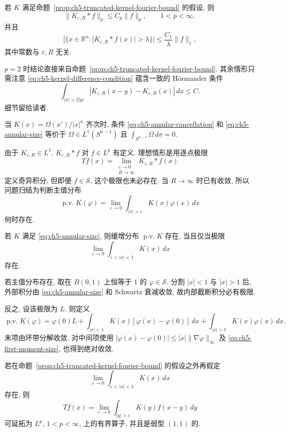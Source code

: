 \hypertarget{chapter-05-page-107}{}
\begin{Corollary}
\label{cor:ch5-uniform-truncation-bounds}
若 $K$ 满足命题~\ref{prop:ch5-truncated-kernel-fourier-bound} 的假设, 则
\[
 \|K_{\varepsilon,R}*f\|_p\le C_p\|f\|_p,
 \qquad 1<p<\infty,
\]
并且
\[
 |\{x\in\mathbb R^n:|K_{\varepsilon,R}*f(x)|>\lambda\}|
 \le\frac{C_1}{\lambda}\|f\|_1,
\]
其中常数与 $\varepsilon,R$ 无关.
\end{Corollary}

$p=2$ 时结论直接来自命题~\ref{prop:ch5-truncated-kernel-fourier-bound}. 其余情形只需注意 \eqref{eq:ch5-kernel-difference-condition} 蕴含一致的 Hörmander 条件
\[
 \int_{|x|>2|y|}|K_{\varepsilon,R}(x-y)-K_{\varepsilon,R}(x)|\,dx\le C.
\]
细节留给读者.

\hypertarget{chapter-05-page-108}{}
当 $K(x)=\Omega(x')/|x|^n$ 齐次时, 条件 \eqref{eq:ch5-annular-cancellation} 和 \eqref{eq:ch5-annular-size} 等价于 $\Omega\in L^1(S^{n-1})$ 且 $\int_{S^{n-1}}\Omega\,d\sigma=0$.

由于 $K_{\varepsilon,R}\in L^1$, $K_{\varepsilon,R}*f$ 对 $f\in L^p$ 有定义. 理想情形是用逐点极限
\[
 Tf(x)=\lim_{\substack{\varepsilon\to0\\R\to\infty}}
 K_{\varepsilon,R}*f(x)
\]
定义奇异积分, 但即便 $f\in\mathcal S$, 这个极限也未必存在. 当 $R\to\infty$ 时已有收敛, 所以问题归结为判断主值分布
\[
 \operatorname{p.v.}K(\varphi)
 =\lim_{\varepsilon\to0}\int_{|x|>\varepsilon}K(x)\varphi(x)\,dx
\]
何时存在.

\begin{Proposition}
\label{prop:ch5-principal-value-existence}
若 $K$ 满足 \eqref{eq:ch5-annular-size}, 则缓增分布 $\operatorname{p.v.}K$ 存在, 当且仅当极限
\[
 \lim_{\varepsilon\to0}\int_{\varepsilon<|x|<1}K(x)\,dx
\]
存在.
\end{Proposition}

\begin{Proof}
若主值分布存在, 取在 $B(0,1)$ 上恒等于 $1$ 的 $\varphi\in\mathcal S$. 分割 $|x|<1$ 与 $|x|>1$ 后, 外部积分由 \eqref{eq:ch5-annular-size} 和 Schwartz 衰减收敛, 故内部截断积分必有极限.

反之, 设该极限为 $L$. 则定义
\[
 \operatorname{p.v.}K(\varphi)=\varphi(0)L
 +\int_{|x|<1}K(x)[\varphi(x)-\varphi(0)]\,dx
 +\int_{|x|>1}K(x)\varphi(x)\,dx.
\]
末项由环带分解收敛. 对中间项使用 $|\varphi(x)-\varphi(0)|\le|x|\|\nabla\varphi\|_\infty$ 及 \eqref{eq:ch5-first-moment-size}, 也得到绝对收敛.
\end{Proof}

\hypertarget{chapter-05-page-109}{}
\begin{Corollary}
\label{cor:ch5-principal-value-operator-bounds}
若在命题~\ref{prop:ch5-truncated-kernel-fourier-bound} 的假设之外再假定
\[
 \lim_{\varepsilon\to0}\int_{\varepsilon<|x|<1}K(x)\,dx
\]
存在, 则
\[
 Tf(x)=\lim_{\varepsilon\to0}\int_{|y|>\varepsilon}K(y)f(x-y)\,dy
\]
可延拓为 $L^p$, $1<p<\infty$, 上的有界算子, 并且是弱型 $(1,1)$ 的.
\end{Corollary}

